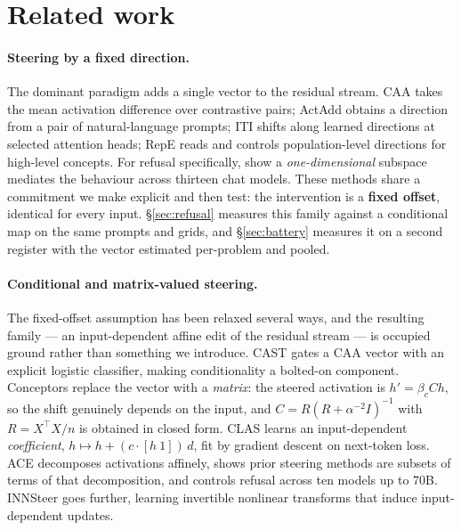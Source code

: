 \documentclass{article}
\begin{document}
\section{Related work}
\label{sec:related}

\paragraph{Steering by a fixed direction.}
The dominant paradigm adds a single vector to the residual stream. CAA \citep{rimsky2024caa} takes
the mean activation difference over contrastive pairs; ActAdd \citep{turner2023actadd} obtains a
direction from a pair of natural-language prompts; ITI \citep{li2023iti} shifts along learned
directions at selected attention heads; RepE \citep{zou2023repe} reads and controls
population-level directions for high-level concepts. For refusal specifically,
\citet{arditi2024refusal} show a \emph{one-dimensional} subspace mediates the behaviour across
thirteen chat models. These methods share a commitment we make explicit and then test: the
intervention is a \textbf{fixed offset}, identical for every input. \S\ref{sec:refusal} measures
this family against a conditional map on the same prompts and grids, and \S\ref{sec:battery}
measures it on a second register with the vector estimated per-problem and pooled.

\paragraph{Conditional and matrix-valued steering.}
The fixed-offset assumption has been relaxed several ways, and the resulting family --- an
input-dependent affine edit of the residual stream --- is occupied ground rather than something we
introduce. CAST \citep{lee2025cast} gates a CAA vector with an explicit logistic classifier, making
conditionality a bolted-on component. Conceptors \citep{postmus2024conceptors} replace the vector
with a \emph{matrix}: the steered activation is $h' = \beta_c C h$, so the shift genuinely depends
on the input, and $C = R(R + \alpha^{-2}I)^{-1}$ with $R = X^\top X/n$ is obtained in closed form.
CLAS \citep{hsu2026clas} learns an input-dependent \emph{coefficient}, $h \mapsto h + (c\cdot[h\
1])\,d$, fit by gradient descent on next-token loss. ACE \citep{marshall2024ace} decomposes
activations affinely, shows prior steering methods are subsets of terms of that decomposition, and
controls refusal across ten models up to 70B. INNSteer \citep{nguyen2026innsteer} goes further,
learning invertible nonlinear transforms that induce input-dependent updates.
\end{document}
